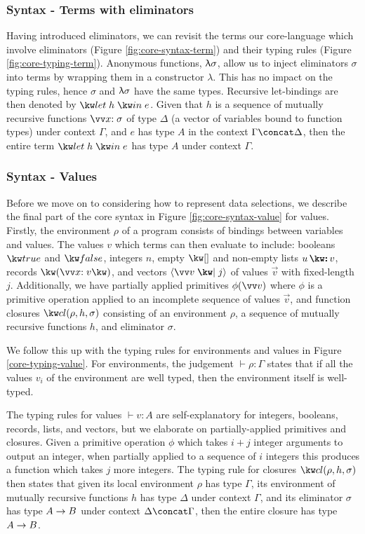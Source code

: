 \subsubsection{Syntax - Terms with eliminators}
\label{sssec:syntax-eliminator-terms}
Having introduced eliminators, we can revisit the terms our core-language which involve eliminators (Figure \ref{fig:core-syntax-term}) and their typing rules (Figure \ref{fig:core-typing-term}). Anonymous functions, $\uplambda{\sigma}$, allow us to inject eliminators $\sigma$ into terms by wrapping them in a constructor $\lambda$. This has no impact on the typing rules, hence $\sigma$ and $\uplambda{\sigma}$ have the same types. Recursive let-bindings are then denoted by $\exLetRecMutual{h}{e}$. Given that $h$ is a sequence of mutually recursive functions $\vec{\bind{x}{\sigma}}$ of type $\Delta$ (a vector of variables bound to function types) under context $\Gamma$, and $e$ has type $A$ in the context $\Gamma \concat \Delta$, then the entire term $\exLetRecMutual{h}{e}$ has type $A$ under context $\Gamma$. 

\subsubsection{Syntax - Values}
Before we move on to considering how to represent data selections, we describe the final part of the core syntax in Figure \ref{fig:core-syntax-value} for values. Firstly, the environment $\rho$ of a program consists of bindings between variables and values. The values $v$ which terms can then evaluate to include: booleans $\exTrue$ and $\exFalse$, integers $n$, empty $\exNil$ and non-empty lists $\exCons{u}{v}$, records $\exRec{\vec{\bind{x}{v}}}$, and vectors $\exVecVal{\vec{v}}{j}$ of values $\vec{v}$ with fixed-length $j$. Additionally, we have partially applied primitives $\exPrimOp{\phi}{\vec{v}}$ where $\phi$ is a primitive operation applied to an incomplete sequence of values $\vec{v}$, and function closures $\exClosure{\rho}{h}{\sigma}$ consisting of an environment $\rho$, a sequence of mutually recursive functions $h$, and eliminator $\sigma$. 


\noindent
We follow this up with the typing rules for environments and values in Figure \ref{core-typing-value}. For environments, the judgement $\vdash \rho: \Gamma$ states that if all the values $v_i$ of the environment are well typed, then the environment itself is well-typed. 

The typing rules for values $\vdash v: A$ are self-explanatory for integers, booleans, records, lists, and vectors, but we elaborate on partially-applied primitives and closures. Given a primitive operation $\phi$ which takes $i+j$ integer arguments to output an integer, when partially applied to a sequence of $i$ integers this produces a function which takes $j$ more integers. The typing rule for closures $\exClosure{\rho}{h}{\sigma}$ then states that given its local environment $\rho$ has type $\Gamma$, its environment of mutually recursive functions $h$ has type $\Delta$ under context $\Gamma$, and its eliminator $\sigma$ has type ${A}\rightarrow{B}$ under context $\Delta \concat \Gamma$, then the entire closure has type ${A}\rightarrow{B}$.

